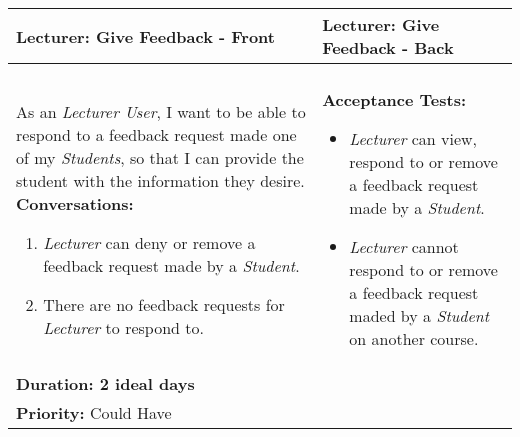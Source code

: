 \documentclass[11pt]{article}
\begin{document}
\begin{center}
\begin{tabular}{ | m{8cm}  |  m{8cm}  | } 
 \hline
 \textbf{Lecturer: Give Feedback - Front} &  \textbf{Lecturer: Give Feedback - Back}  \\ 
  \hline
&\\[5pt]
As an \emph{Lecturer User}, I want to be able to respond to a feedback request made one of my \emph{Students}, so that I can provide the student with the information they desire. 
\newline
\textbf{Conversations:}
\begin{enumerate}
\item{\emph{Lecturer} can deny or remove a feedback request made by a \emph{Student}.}
\item{There are no feedback requests for \emph{Lecturer} to respond to.}
\end{enumerate}
& \textbf{Acceptance Tests:} 
\begin{itemize}
\item{\emph{Lecturer} can view, respond to or remove a feedback request made by a \emph{Student}.}
\item{\emph{Lecturer} cannot respond to or remove a feedback request maded by a \emph{Student} on another course.}
\end{itemize} \\
\textbf{Duration: 2 ideal days} &\\
\textbf{Priority:}  \textcolor{dkgreen}{Could Have} & \\
 \hline
\end{tabular}
\end{center}
\end{document}
